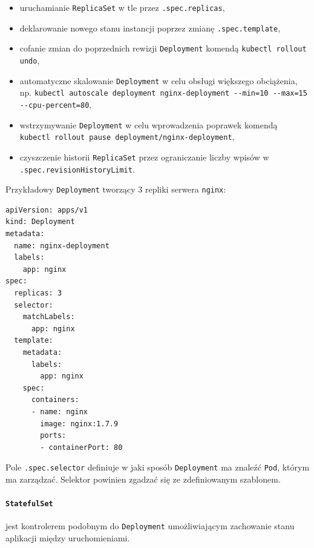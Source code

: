 \documentclass[a4paper,12pt,twoside,openany]{report}
\providecommand{\tightlist}{%
  \setlength{\itemsep}{0pt}\setlength{\parskip}{0pt}}
\newcommand{\passthrough}[1]{#1}
\begin{document}
\begin{itemize}
\tightlist
\item
  uruchamianie \passthrough{\lstinline!ReplicaSet!} w tle przez
  \passthrough{\lstinline!.spec.replicas!},
\item
  deklarowanie nowego stanu instancji poprzez zmianę
  \passthrough{\lstinline!.spec.template!},
\item
  cofanie zmian do poprzednich rewizji
  \passthrough{\lstinline!Deployment!} komendą
  \passthrough{\lstinline!kubectl rollout undo!},
\item
  automatyczne skalowanie \passthrough{\lstinline!Deployment!} w celu
  obsługi większego obciążenia, np.
  \passthrough{\lstinline!kubectl autoscale deployment nginx-deployment --min=10 --max=15 --cpu-percent=80!},
\item
  wstrzymywanie \passthrough{\lstinline!Deployment!} w celu wprowadzenia
  poprawek komendą
  \passthrough{\lstinline!kubectl rollout pause deployment/nginx-deployment!},
\item
  czyszczenie historii \passthrough{\lstinline!ReplicaSet!} przez
  ograniczanie liczby wpisów w
  \passthrough{\lstinline!.spec.revisionHistoryLimit!}.
\end{itemize}

Przykładowy \passthrough{\lstinline!Deployment!} tworzący 3 repliki
serwera \passthrough{\lstinline!nginx!}:

\begin{lstlisting}
apiVersion: apps/v1
kind: Deployment
metadata:
  name: nginx-deployment
  labels:
    app: nginx
spec:
  replicas: 3
  selector:
    matchLabels:
      app: nginx
  template:
    metadata:
      labels:
        app: nginx
    spec:
      containers:
      - name: nginx
        image: nginx:1.7.9
        ports:
        - containerPort: 80
\end{lstlisting}

Pole \passthrough{\lstinline!.spec.selector!} definiuje w jaki sposób
\passthrough{\lstinline!Deployment!} ma znaleźć
\passthrough{\lstinline!Pod!}, którym ma zarządzać. Selektor powinien
zgadzać się ze zdefiniowanym szablonem.

\hypertarget{statefulset}{%
\paragraph{\texorpdfstring{\texttt{StatefulSet}}{StatefulSet}}\label{statefulset}}

jest kontrolerem podobnym do \passthrough{\lstinline!Deployment!}
umożliwiającym zachowanie stanu aplikacji między uruchomieniami.
\end{document}
